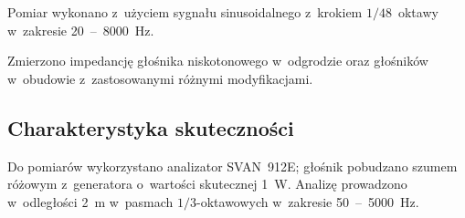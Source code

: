 \documentclass[12pt]{oska}
\newcommand{\range}[2]{\num{#1}~--~\num{#2}}
\begin{document}
			
			Pomiar wykonano z~użyciem sygnału sinusoidalnego z~krokiem $1/48$~oktawy w~zakresie \range{20}{8000}~\si{\hertz}.
			
			Zmierzono impedancję głośnika niskotonowego w~odgrodzie oraz głośników w~obudowie z~zastosowanymi różnymi modyfikacjami. 
			
			
			
		\subsection{Charakterystyka skuteczności}
			
			Do pomiarów wykorzystano analizator SVAN~912E; głośnik pobudzano szumem różowym z~generatora o~wartości skutecznej \SI{1}{\watt}. Analizę prowadzono w~odległości \SI{2}{\metre} w~pasmach $1/3$-oktawowych w~zakresie \range{50}{5000}~\si{\hertz}.
			
			
\end{document}

